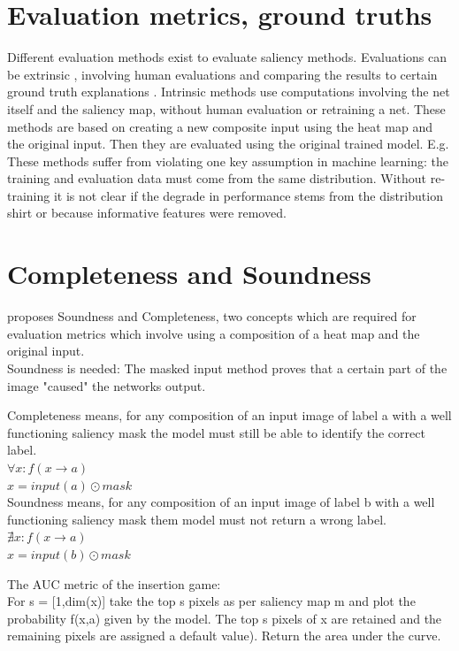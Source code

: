 \section{Evaluation metrics, ground truths \cite{gupta2022new}}

Different evaluation methods exist to evaluate saliency methods. Evaluations can be extrinsic \cite{gupta2022new}, involving human evaluations and comparing the results to certain ground truth explanations \cite{article}. Intrinsic methods use computations involving the net itself and the saliency map, without human evaluation or retraining a net. These methods are based on creating a new composite input using the heat map and the original input. Then they are evaluated using the original trained model.  E.g.\cite{dabkowski2017real} These methods suffer from violating one key assumption in machine learning: the training and evaluation data must come from the same distribution. \cite{hooker2019benchmark} Without re-training it is not clear if the degrade in performance stems from the distribution shirt or because informative features were removed.

\section{Completeness and Soundness}

\cite{gupta2022new} proposes Soundness and Completeness, two concepts which are required for evaluation metrics which involve using a composition of a heat map and the original input.\\
Soundness is needed: The masked input method proves that a certain part of the image "caused" the networks output. 

Completeness means, for any composition of an input image of label a with a well functioning saliency mask the model must still be able to identify the correct label.\\
$ \forall x: f(x\rightarrow a)$\\
$ x = input(a) \odot mask$\\
Soundness means, for any composition of an input image of label b with a well functioning saliency mask them model must not return a wrong label.\\
$ \nexists x: f(x\rightarrow a)$\\
$ x = input(b) \odot mask$

The AUC metric \cite{petsiuk2018rise} of the insertion game:\\
For s = [1,dim(x)] take the top s pixels as per saliency map m and plot the probability f(x,a) given by the model. The top s pixels of x are retained and the  remaining pixels are assigned a default value). Return the area under the curve.\\\


